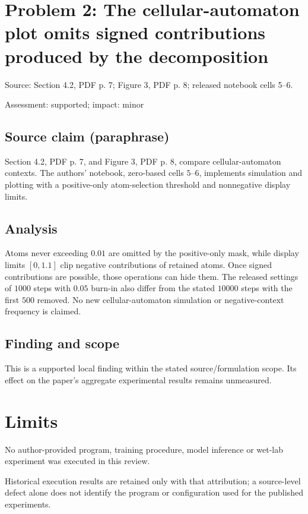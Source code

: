\documentclass[11pt]{article}
\begin{document}
\section*{Problem 2: The cellular-automaton plot omits signed contributions produced by the decomposition}

Source: Section 4.2, PDF p. 7; Figure 3, PDF p. 8; released notebook cells 5–6.

Assessment: supported; impact: minor

\subsection*{Source claim (paraphrase)}

Section 4.2, PDF p. 7, and Figure 3, PDF p. 8, compare cellular-automaton contexts. The authors' notebook, zero-based cells \(5\)–\(6\), implements simulation and plotting with a positive-only atom-selection threshold and nonnegative display limits.

\subsection*{Analysis}

Atoms never exceeding \(0.01\) are omitted by the positive-only mask, while display limits \([0,1.1]\) clip negative contributions of retained atoms. Once signed contributions are possible, those operations can hide them. The released settings of \(1000\) steps with \(0.05\) burn-in also differ from the stated \(10000\) steps with the first \(500\) removed. No new cellular-automaton simulation or negative-context frequency is claimed.

\subsection*{Finding and scope}

This is a supported local finding within the stated source/formulation scope. Its effect on the paper's aggregate experimental results remains unmeasured.

\section*{Limits}

No author-provided program, training procedure, model inference or wet-lab experiment was executed in this review.\par

Historical execution results are retained only with that attribution; a source-level defect alone does not identify the program or configuration used for the published experiments.\par
\end{document}
